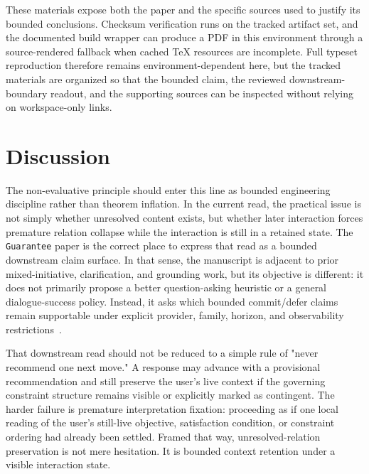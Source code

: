 \documentclass[11pt]{article}
\renewcommand{\_}{\textunderscore\hspace{0pt}}
\begin{document}
\begin{sloppypar}
These materials expose both the paper and the specific sources used to justify
its bounded conclusions. Checksum verification runs on the tracked artifact
set, and the documented build wrapper can produce a PDF in this environment
through a source-rendered fallback when cached TeX resources are incomplete.
Full typeset reproduction therefore remains environment-dependent here, but
the tracked materials are organized so that the bounded claim, the reviewed
downstream-boundary readout, and the supporting sources can be inspected
without relying on workspace-only links.
\end{sloppypar}

\section{Discussion}

The non-evaluative principle should enter this line as bounded engineering
discipline rather than theorem inflation. In the current read, the practical issue
is not simply whether unresolved content exists, but whether later interaction
forces premature relation collapse while the interaction is still in a retained
state. The \texttt{Guarantee} paper is the correct place to express that read as
a bounded downstream claim surface. In that sense, the manuscript is adjacent to
prior mixed-initiative, clarification, and grounding work, but its objective is
different: it does not primarily propose a better question-asking heuristic or a
general dialogue-success policy. Instead, it asks which bounded commit/defer
claims remain supportable under explicit provider, family, horizon, and
observability restrictions~\cite{chucarroll2000mimic,deboni2003clarification,rao2018evpi,benotti2021grounding,sahay-etal-2025-ask,wen-etal-2025-know,madhusudhan-etal-2025-llms}.

That downstream read should not be reduced to a simple rule of "never recommend
one next move." A response may advance with a provisional recommendation and
still preserve the user's live context if the governing constraint structure
remains visible or explicitly marked as contingent. The harder failure is
premature interpretation fixation: proceeding as if one local reading of the
user's still-live objective, satisfaction condition, or constraint ordering had
already been settled. Framed that way, unresolved-relation preservation is not
mere hesitation. It is bounded context retention under a visible interaction
state.
\end{document}
